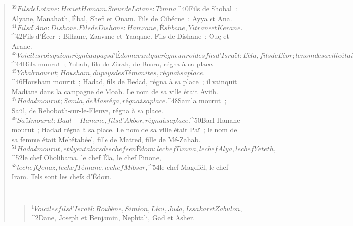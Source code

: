 \begin{verse}
${}^{39}Fils de Lotane : Hori et Homam. Sœur de Lotane : Timna. 
${}^{40}Fils de Shobal : Alyane, Manahath, Ébal, Shefi et Onam. Fils de Cibéone : Ayya et Ana. 
${}^{41}Fils d’Ana : Dishone. Fils de Dishone : Hamrane, Éshbane, Yitrane et Kerane. 
${}^{42}Fils d’Écer : Bilhane, Zaavane et Yaaqane. Fils de Dishane : Ouç et Arane.
${}^{43}Voici les rois qui ont régné au pays d’Édom avant que règne un roi des fils d’Israël : Bèla, fils de Béor ; le nom de sa ville était Dinhaba. 
${}^{44}Bèla mourut ; Yobab, fils de Zèrah, de Bosra, régna à sa place. 
${}^{45}Yobab mourut ; Housham, du pays des Témanites, régna à sa place. 
${}^{46}Housham mourut ; Hadad, fils de Bedad, régna à sa place ; il vainquit Madiane dans la campagne de Moab. Le nom de sa ville était Avith. 
${}^{47}Hadad mourut ; Samla, de Masréqa, régna à sa place. 
${}^{48}Samla mourut ; Saül, de Rehoboth-sur-le-Fleuve, régna à sa place. 
${}^{49}Saül mourut ; Baal-Hanane, fils d’Akbor, régna à sa place. 
${}^{50}Baal-Hanane mourut ; Hadad régna à sa place. Le nom de sa ville était Paï ; le nom de sa femme était Mehétabéel, fille de Matred, fille de Mé-Zahab. 
${}^{51}Hadad mourut, et il y eut alors des chefs en Édom : le chef Timna, le chef Alya, le chef Yeteth, 
${}^{52}le chef Oholibama, le chef Éla, le chef Pinone, 
${}^{53}le chef Qenaz, le chef Témane, le chef Mibsar, 
${}^{54}le chef Magdiël, le chef Iram. Tels sont les chefs d’Édom.
      
         
      \bchapter{}
      \begin{verse}
${}^{1}Voici les fils d’Israël : Roubène, Siméon, Lévi, Juda, Issakar et Zabulon, 
${}^{2}Dane, Joseph et Benjamin, Nephtali, Gad et Asher.
      

\end{verse}
\end{verse}
